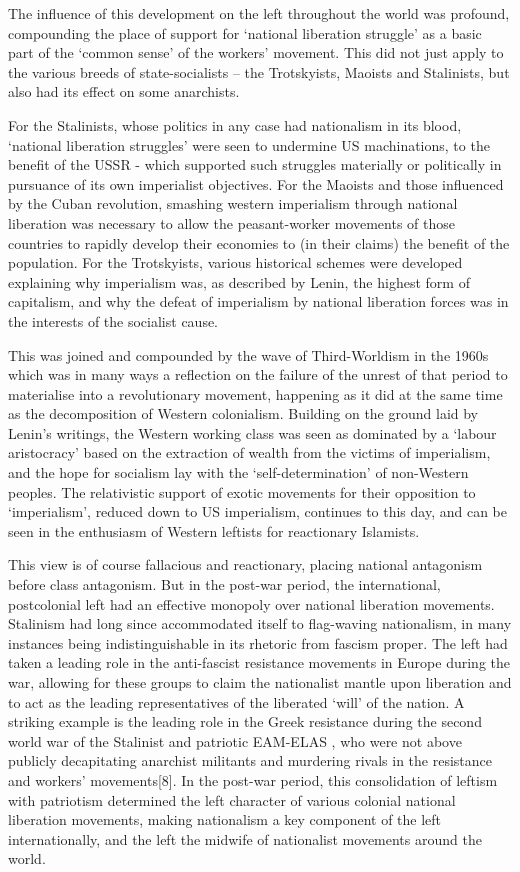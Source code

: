 The influence of this development on the left throughout the world was profound, compounding the place of support for ‘national liberation struggle’ as a basic part of the ‘common sense’ of the workers’ movement. This did not just apply to the various breeds of state-socialists – the Trotskyists, Maoists and Stalinists, but also had its effect on some anarchists.

For the Stalinists, whose politics in any case had nationalism in its blood, ‘national liberation struggles’ were seen to undermine US machinations, to the benefit of the USSR - which supported such struggles materially or politically in pursuance of its own imperialist objectives. For the Maoists and those influenced by the Cuban revolution, smashing western imperialism through national liberation was necessary to allow the peasant-worker movements of those countries to rapidly develop their economies to (in their claims) the benefit of the population. For the Trotskyists, various historical schemes were developed explaining why imperialism was, as described by Lenin, the highest form of capitalism, and why the defeat of imperialism by national liberation forces was in the interests of the socialist cause.

This was joined and compounded by the wave of Third-Worldism in the 1960s which was in many ways a reflection on the failure of the unrest of that period to materialise into a revolutionary movement, happening as it did at the same time as the decomposition of Western colonialism. Building on the ground laid by Lenin’s writings, the Western working class was seen as dominated by a ‘labour aristocracy’ based on the extraction of wealth from the victims of imperialism, and the hope for socialism lay with the ‘self-determination’ of non-Western peoples. The relativistic support of exotic movements for their opposition to ‘imperialism’, reduced down to US imperialism, continues to this day, and can be seen in the enthusiasm of Western leftists for reactionary Islamists.

This view is of course fallacious and reactionary, placing national antagonism before class antagonism. But in the post-war period, the international, postcolonial left had an effective monopoly over national liberation movements. Stalinism had long since accommodated itself to flag-waving nationalism, in many instances being indistinguishable in its rhetoric from fascism proper. The left had taken a leading role in the anti-fascist resistance movements in Europe during the war, allowing for these groups to claim the nationalist mantle upon liberation and to act as the leading representatives of the liberated ‘will’ of the nation. A striking example is the leading role in the Greek resistance during the second world war of the Stalinist and patriotic EAM-ELAS , who were not above publicly decapitating anarchist militants and murdering rivals in the resistance and workers’ movements[8]. In the post-war period, this consolidation of leftism with patriotism determined the left character of various colonial national liberation movements, making nationalism a key component of the left internationally, and the left the midwife of nationalist movements around the world.

